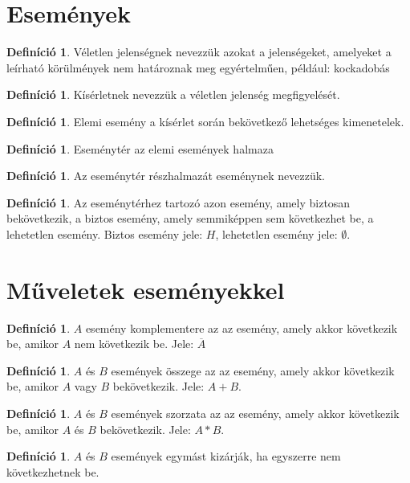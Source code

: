\documentclass[twoside,12pt]{report}
\theoremstyle{definition}
\newtheorem{definition}[theorem]{Definíció}
\begin{document}
\section{Események}
	\begin{definition}
		Véletlen jelenségnek nevezzük azokat a jelenségeket, amelyeket a leírható körülmények
		nem határoznak meg egyértelműen, például: kockadobás
	\end{definition}
	\begin{definition}
		Kísérletnek nevezzük a véletlen jelenség megfigyelését.
	\end{definition}
	\begin{definition}
		Elemi esemény a kísérlet során bekövetkező lehetséges kimenetelek.
	\end{definition}
	\begin{definition}
		Eseménytér az elemi események halmaza
	\end{definition}
	\begin{definition}
		Az eseménytér részhalmazát eseménynek nevezzük.
	\end{definition}
	\begin{definition}
		Az eseménytérhez tartozó azon esemény, amely biztosan bekövetkezik, a biztos esemény,
		amely semmiképpen sem következhet be, a lehetetlen esemény. Biztos esemény jele: $H$, lehetetlen esemény jele: $\emptyset$.
	\end{definition}
\section{Műveletek eseményekkel}
	\begin{definition}
		$A$ esemény komplementere az az esemény, amely akkor következik be, amikor $A$ nem következik be. Jele: $\overline{A}$
	\end{definition}
	\begin{definition}
		$A$ és $B$ események összege az az esemény, amely akkor következik be, amikor $A$ vagy $B$ bekövetkezik. Jele: $A+B$.
	\end{definition}
	\begin{definition}
		$A$ és $B$ események szorzata az az esemény, amely akkor következik be, amikor $A$ és $B$ bekövetkezik. Jele: $A*B$.
	\end{definition}
	\begin{definition}
		$A$ és $B$ események egymást kizárják, ha egyszerre nem következhetnek be.
	\end{definition}
\end{document}
